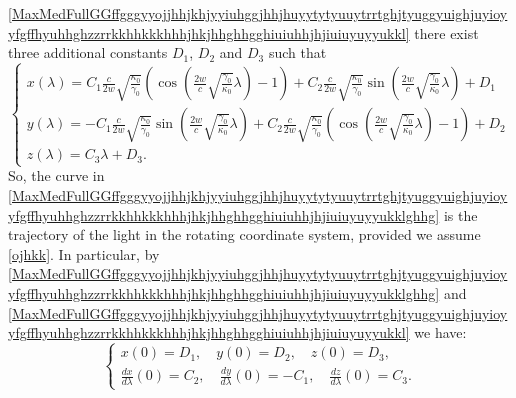 \documentclass{article}
\theoremstyle{definition}
\theoremstyle{remark}
\renewcommand{\vec}[1]{\mathbf{#1}}
\newcommand{\er}{\eqref}
\newcommand{\er}{\eqref}
\begin{document}
\er{MaxMedFullGGffgggyyojjhhjkhjyyiuhggjhhjhuyytytyuuytrrtghjtyuggyuighjuyioyyfgffhyuhhghzzrrkkhhkkkhhhjhkjhhghhgghiuiuhhjhjiuiuyuyyukkl}
there exist three additional constants $D_1$, $D_2$ and $D_3$ such
that
\begin{equation}\label{MaxMedFullGGffgggyyojjhhjkhjyyiuhggjhhjhuyytytyuuytrrtghjtyuggyuighjuyioyyfgffhyuhhghzzrrkkhhkkkhhhjhkjhhghhgghiuiuhhjhjiuiuyuyyukklghhg}
\begin{cases}
x(\lambda)=C_1\frac{c}{2w}\sqrt{\frac{\kappa_0}{\gamma_0}}\left(\cos{\left(\frac{2w}{c}\sqrt{\frac{\gamma_0}{\kappa_0}}\lambda\right)}-1\right)+C_2\frac{c}{2w}\sqrt{\frac{\kappa_0}{\gamma_0}}\sin{\left(\frac{2w}{c}\sqrt{\frac{\gamma_0}{\kappa_0}}\lambda\right)}+D_1
\\
y(\lambda)=-C_1\frac{c}{2w}\sqrt{\frac{\kappa_0}{\gamma_0}}\sin{\left(\frac{2w}{c}\sqrt{\frac{\gamma_0}{\kappa_0}}\lambda\right)}+C_2\frac{c}{2w}\sqrt{\frac{\kappa_0}{\gamma_0}}\left(\cos{\left(\frac{2w}{c}\sqrt{\frac{\gamma_0}{\kappa_0}}\lambda\right)}-1\right)+D_2
\\
z(\lambda)=C_3\lambda+D_3.
\end{cases}
\end{equation}
So, the curve in
\er{MaxMedFullGGffgggyyojjhhjkhjyyiuhggjhhjhuyytytyuuytrrtghjtyuggyuighjuyioyyfgffhyuhhghzzrrkkhhkkkhhhjhkjhhghhgghiuiuhhjhjiuiuyuyyukklghhg}
is the trajectory of the light in the rotating coordinate system,
provided we assume \er{ojhkk}. In particular, by
\er{MaxMedFullGGffgggyyojjhhjkhjyyiuhggjhhjhuyytytyuuytrrtghjtyuggyuighjuyioyyfgffhyuhhghzzrrkkhhkkkhhhjhkjhhghhgghiuiuhhjhjiuiuyuyyukklghhg}
and
\er{MaxMedFullGGffgggyyojjhhjkhjyyiuhggjhhjhuyytytyuuytrrtghjtyuggyuighjuyioyyfgffhyuhhghzzrrkkhhkkkhhhjhkjhhghhgghiuiuhhjhjiuiuyuyyukkl}
we have:
\begin{equation}\label{MaxMedFullGGffgggyyojjhhjkhjyyiuhggjhhjhuyytytyuuytrrtghjtyuggyuighjuyioyyfgffhyuhhghzzrrkkhhkkkhhhjhkjhhghhgghiuiuhhjhjiuiuyuyyuojkjkkkhgugg}
\begin{cases}
x(0)=D_1,\quad y(0)=D_2,\quad z(0)=D_3,\\
\frac{dx}{d\lambda}(0)=C_2,\quad\frac{dy}{d\lambda}(0)=-C_1,\quad\frac{dz}{d\lambda}(0)=C_3.
\end{cases}
\end{equation}
%
%
%
\begin{comment} Moreover, by
\er{MaxMedFullGGffgggyyojjhhjkhjyyiuhggjhhjhuyytytyuuytrrtghjtyuggyuighjuyioyyfgffhyuhhghzzrrkkhhkkkhhhjhkjhhghhgghiuiuhhjhjiuiuyuyyukkl}
the radius of curvature of the curve satisfies:
\begin{equation}\label{MaxMedFullGGffgggyyojjhhjkhjyyiuhggjhhjhuyytytyuuytrrtghjtyuggyuighjuyioyyfgffhyuhhghzzrrkkhhkkkhhhjhkjhhghhgghiuiuhhjhjiuiuyuyyukklklihi}
R:=\frac{1}{\left|\frac{d^2\vec
r}{d\lambda^2}\right|}=\frac{c}{2w}\sqrt{\frac{\kappa_0}{\gamma_0}}\frac{1}{C^2_1+C^2_2}\,.
\end{equation}
\end{comment}
\end{document}
